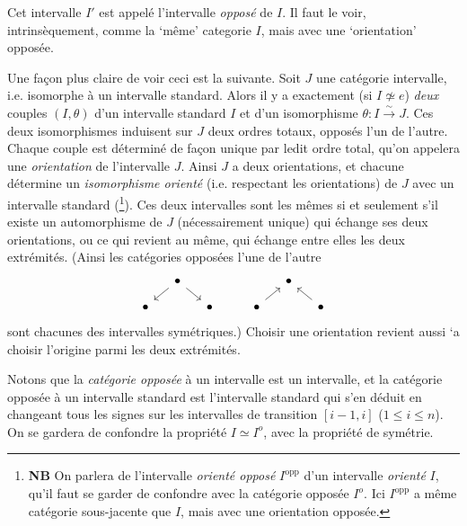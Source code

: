 \documentclass[11pt]{article}
\newcommand{\printedpage}[1]{\marginpar{\footnotesize p.~#1}}
\newcommand{\msp}[1]{\marginpar{\footnotesize [#1]}}
\begin{document}
Cet intervalle $I'$ est appelé l'intervalle \textit{opposé} de $I$. Il faut le voir, intrinsèquement, comme la `même' categorie $I$, %
mais avec une `orientation' opposée.

\msp{page 8}

Une façon plus claire de voir ceci est la suivante. Soit $J$ une catégorie intervalle, i.e. isomorphe à un intervalle standard. Alors il y a exactement (si $I \not\simeq e$) \textit{deux} couples $(I,\theta)$ d'un intervalle standard $I$ et d'un isomorphisme $\theta : I \xrightarrow{\sim} J$. Ces deux isomorphismes induisent sur $J$ deux ordres totaux, opposés l'un de l'autre. Chaque couple est déterminé de façon unique par ledit ordre total, qu'on appelera %
une \textit{orientation} de l'intervalle $J$. Ainsi $J$ a deux orientations, et chacune détermine un \textit{isomorphisme orienté} (i.e. respectant
\printedpage{5}
les orientations) de $J$ avec un intervalle standard (\footnote[2]{\textbf{NB} On parlera de l'intervalle \textit{orienté opposé} $I^{\mathrm{opp}}$ d'un intervalle \textit{orienté} $I$, qu'il faut se garder de confondre avec la catégorie opposée $I^o$. Ici $I^{\mathrm{opp}}$ a même catégorie sous-jacente que $I$, mais avec une orientation opposée.}). Ces deux intervalles sont les mêmes si et seulement s'il existe un automorphisme de $J$ (nécessairement unique) qui échange ses deux orientations, ou ce qui revient au même, qui échange entre elles les deux extrémités. (Ainsi les catégories opposées l'une de l'autre
\[
\begin{tikzcd}[column sep=small, row sep=small]
 & \bullet \arrow[dl] \arrow[dr] & & & & \bullet & \\
 \bullet & & \bullet & & \bullet \arrow[ur] & & \bullet \arrow[ul]
\end{tikzcd}
\]
sont chacunes %
des intervalles symétriques.) Choisir une orientation revient aussi `a %
choisir l'origine parmi les deux extrémités.

Notons que la \textit{catégorie opposée} à un intervalle est un intervalle, et la catégorie opposée à un intervalle standard est l'intervalle standard qui s'en déduit en changeant tous les signes sur les intervalles de transition $[i-1,i]$ ($1 \leq i \leq n$). On se gardera de confondre la propriété $I \simeq I^o$, avec la propriété de symétrie.

\msp{page 9}
\end{document}
